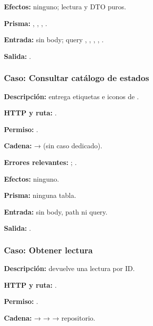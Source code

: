 \textbf{Efectos:} ninguno; lectura y DTO puros.  

\textbf{Prisma:} \texttt{}, \texttt{}, \texttt{}, \texttt{}.  

\textbf{Entrada:} sin body; query \texttt{}, \texttt{}, \texttt{}, \texttt{}, \texttt{}.  

\textbf{Salida:} \texttt{}.


\subsubsection{Caso: Consultar catálogo de estados}


\textbf{Descripción:} entrega etiquetas e iconos de \texttt{}.  

\textbf{HTTP y ruta:} \texttt{}.  

\textbf{Permiso:} \texttt{}.  

\textbf{Cadena:} \texttt{} → \texttt{} (sin caso dedicado).  

\textbf{Errores relevantes:} \texttt{}; \texttt{}.  

\textbf{Efectos:} ninguno.  

\textbf{Prisma:} ninguna tabla.  

\textbf{Entrada:} sin body, path ni query.  

\textbf{Salida:} \texttt{}.


\subsubsection{Caso: Obtener lectura}


\textbf{Descripción:} devuelve una lectura por ID.  

\textbf{HTTP y ruta:} \texttt{}.  

\textbf{Permiso:} \texttt{}.  

\textbf{Cadena:} \texttt{} → \texttt{} → \texttt{} → repositorio.  

